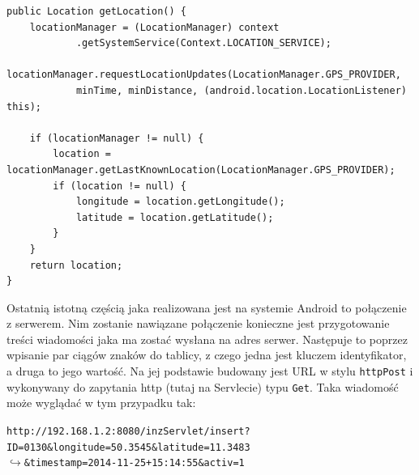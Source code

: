 \documentclass[eng,printmode,oneside]{mgr}
\begin{document}
\begin{lstlisting}[caption=Pobieranie lokalizacji
kuriera metoda getLocation() z klasy GpsTrack,label=lst:GpsTrack.java]
public Location getLocation() {
	locationManager = (LocationManager) context
			.getSystemService(Context.LOCATION_SERVICE);
	locationManager.requestLocationUpdates(LocationManager.GPS_PROVIDER,
			minTime, minDistance, (android.location.LocationListener) this);
			
	if (locationManager != null) {
		location = locationManager.getLastKnownLocation(LocationManager.GPS_PROVIDER);
		if (location != null) {
			longitude = location.getLongitude();
			latitude = location.getLatitude();
		}
	}
	return location;
}
\end{lstlisting}

Ostatnią istotną częścią jaka realizowana jest na systemie Android to połączenie
z serwerem. Nim zostanie nawiązane połączenie konieczne jest przygotowanie
treści wiadomości jaka ma zostać wysłana na adres serwer. Następuje to poprzez
wpisanie par ciągów znaków do tablicy, z czego jedna jest kluczem identyfikator,
a druga to jego wartość. Na jej podstawie budowany jest URL w
stylu \texttt{httpPost} i wykonywany do zapytania http (tutaj na Servlecie) typu
\texttt{Get}. Taka wiadomość może wyglądać w tym przypadku tak:

\begin{flushright}
\texttt{http://192.168.1.2:8080/inzServlet/insert?ID=0130\&longitude=50.3545\&latitude=11.3483
\\$\hookrightarrow$\&timestamp=2014-11-25+15:14:55\&activ=1}
\end{flushright}
\end{document}
